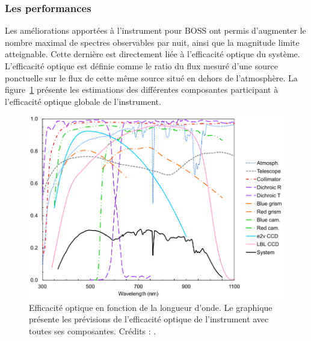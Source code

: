 \documentclass[11pt, twoside, a4paper, openright]{report}
\begin{document}
\subsubsection{Les performances}
Les améliorations apportées à l'instrument pour BOSS ont permis d'augmenter le nombre maximal de spectres observables par nuit, ainsi que la magnitude limite atteignable. Cette dernière est directement liée à l'efficacité optique du système. L'efficacité optique est définie comme le ratio du flux mesuré d'une source ponctuelle sur le flux de cette même source situé en dehors de l'atmosphère. La figure~\ref{fig:SpectroThroughput} présente les estimations des différentes composantes participant à l'efficacité optique globale de l'instrument. %
\begin{figure}
  \centering
  \includegraphics[scale=0.35]{SpectroThroughput}
  \caption{Efficacité optique en fonction de la longueur d'onde. Le graphique présente les prévisions de l'efficacité optique de l'instrument avec toutes ses composantes. Crédits : \textcite{Smee2012}.}
  \label{fig:SpectroThroughput}
\end{figure}
\end{document}
